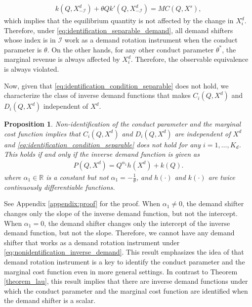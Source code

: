 \documentclass[11pt, a4paper]{article}
\newtheorem{proposition}{Proposition}
\theoremstyle{remark}
\begin{document}
\begin{align}
    k(Q, X^{d}_{-\mathcal{I}}) + \theta Qk'(Q, X^{d}_{-\mathcal{I}}) = MC(Q, X^{s}),
\end{align}
which implies that the equilibrium quantity is not affected by the change in $X^{d}_i$.
Therefore, under \eqref{eq:identification_separable_demand}, all demand shifters whose index is in $\mathcal{I}$ work as a demand rotation instrument when the conduct parameter is $\theta$.
On the other hands, for any other conduct parameter $\theta^{*}$, the marginal revenue is always affected by $X^{d}_i$.
Therefore, the observable equivalence is always violated.







Now, given that \eqref{eq:identification_condition_separable} does not hold, we characterize the class of inverse demand functions that makes $C_i(Q, X^{d})$ and $D_i(Q, X^{d})$ independent of $X^{d}$.
\begin{proposition}\label{proposition:nonidentification_inverse_demand}
    Non-identification of the conduct parameter and the marginal cost function implies that $C_i(Q, X^{d})$ and $D_i(Q, X^{d})$ are independent of $X^{d}$ and \eqref{eq:identification_condition_separable} does not hold for any $i = 1, \ldots, K_d$.
    This holds if and only if the inverse demand function is given as
    \begin{align}
        P(Q, X^{d}) = Q^{\alpha_1}h(X^{d}) + k(Q). \label{eq:nonidentification_inverse_demand}
    \end{align}
    where $\alpha_1 \in \mathbb{R}$ is a constant but not $\alpha_1 = -\frac{1}{\theta}$, and $h(\cdot)$ and $k(\cdot)$ are twice continuously differentiable functions.
\end{proposition}
See Appendix \ref{appendix:proof} for the proof.
When $\alpha_1 \ne 0$, the demand shifter changes only the slope of the inverse demand function, but not the intercept.
When $\alpha_1 = 0$, the demand shifter changes only the intercept of the inverse demand function, but not the slope.
Therefore, we cannot have any demand shifter that works as a demand rotation instrument under \eqref{eq:nonidentification_inverse_demand}.
This result emphasizes the idea of \citet{bresnahan1982oligopoly} that demand rotation instrument is a key to identify the conduct parameter and the marginal cost function even in more general settings.
In contrast to Theorem \ref{theorem_lau}, this result implies that there are inverse demand functions under which the conduct parameter and the marginal cost function are identified when the demand shifter is a scalar.
\end{document}
